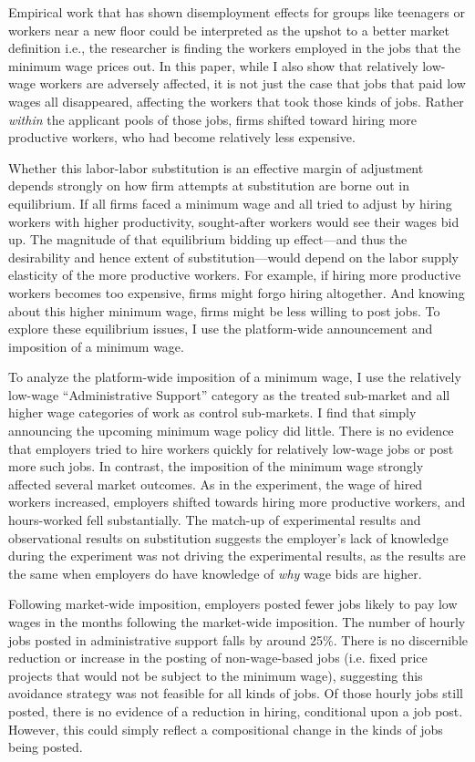 \documentclass[AER]{AEA}
\begin{document}
Empirical work that has shown disemployment effects for groups like teenagers or workers near a new floor could be interpreted as the upshot to a better market definition i.e., the researcher is finding the workers employed in the jobs that the minimum wage prices out.
In this paper, while I also show that relatively low-wage workers are adversely affected, it is not just the case that jobs that paid low wages all disappeared, affecting the workers that took those kinds of jobs.
Rather \emph{within} the applicant pools of those jobs, firms shifted toward hiring more productive workers, who had become relatively less expensive. 

Whether this labor-labor substitution is an effective margin of adjustment depends strongly on how firm attempts at substitution are borne out in equilibrium.
If all firms faced a minimum wage and all tried to adjust by hiring workers with higher productivity, sought-after workers would see their wages bid up. 
The magnitude of that equilibrium bidding up effect---and thus the desirability and hence extent of substitution---would depend on the labor supply elasticity of the more productive workers. 
For example, if hiring more productive workers becomes too expensive, firms might forgo hiring altogether.
And knowing about this higher minimum wage, firms might be less willing to post jobs.
To explore these equilibrium issues, I use the platform-wide announcement and imposition of a minimum wage.     

To analyze the platform-wide imposition of a minimum wage, I use the relatively low-wage ``Administrative Support'' category as the treated sub-market and all higher wage categories of work as control sub-markets. 
I find that simply announcing the upcoming minimum wage policy did little. 
There is no evidence that employers tried to hire workers quickly for relatively low-wage jobs or post more such jobs.
In contrast, the imposition of the minimum wage strongly affected several market outcomes.
As in the experiment, the wage of hired workers increased, employers shifted towards hiring more productive workers, and hours-worked fell substantially. 
The match-up of experimental results and observational results on substitution suggests the employer's lack of knowledge during the experiment was not driving the experimental results, as the results are the same when employers do have knowledge of \emph{why} wage bids are higher. 

Following market-wide imposition, employers posted fewer jobs likely to pay low wages in the months following the market-wide imposition.
The number of hourly jobs posted in administrative support falls by around 25\%.
There is no discernible reduction or increase in the posting of non-wage-based jobs (i.e. fixed price projects that would not be subject to the minimum wage), suggesting this avoidance strategy was not feasible for all kinds of jobs.
Of those hourly jobs still posted, there is no evidence of a reduction in hiring, conditional upon a job post.
However, this could simply reflect a compositional change in the kinds of jobs being posted.
\end{document}
